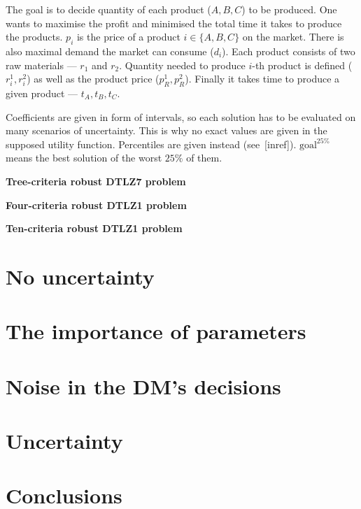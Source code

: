 \begin{description}
    The goal is to decide quantity of each product ($A, B, C$) to be
    produced. One wants to maximise the profit and minimised the total time it
    takes to produce the products. $p_i$ is the price of a product $i \in \{A,
    B, C\}$ on the market. There is also maximal demand the market can consume
    ($d_i$). Each product consists of two raw materials --- $r_1$ and
    $r_2$. Quantity needed to produce $i$-th product is defined ($r^1_i,
    r^2_i$) as well as the product price ($p^1_R, p^2_R$). Finally it takes
    time to produce a given product --- $t_A, t_B, t_C$.

    Coefficients are given in form of intervals, so each solution has to be
    evaluated on many scenarios of uncertainty. This is why no exact values
    are given in the supposed utility function. Percentiles are given instead
    (see~[inref]). $\text{goal}^{25\%}$ means the best solution of the worst
    $25\%$ of them.

  \item{\textbf{Tree-criteria robust DTLZ7 problem}}

  \item{\textbf{Four-criteria robust DTLZ1 problem}}

  \item{\textbf{Ten-criteria robust DTLZ1 problem}}

\end{description}

\section{No uncertainty}

\section{The importance of parameters}

\section{Noise in the DM's decisions}

\section{Uncertainty}

\section{Conclusions}

